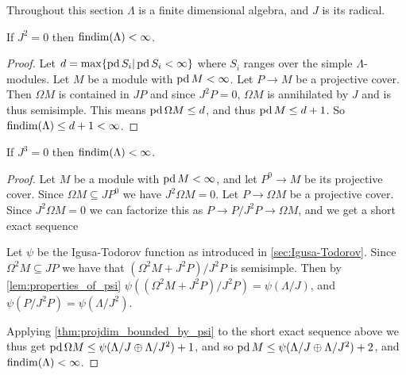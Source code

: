 Throughout this section $\Lambda$ is a finite dimensional algebra, and $J$ is its radical.

\begin{theorem}
	If $J^2=0$ then $\operatorname{findim}(\Lambda) < \infty$.
	\begin{proof}
		Let $d = \max\{\operatorname{pd} S_i | \operatorname{pd} S_i < \infty\}$ where $S_i$ ranges over the simple $\Lambda$-modules. Let $M$ be a module with $\operatorname{pd} M < \infty$. Let $P \to M$ be a projective cover. Then $\Omega M$ is contained in $JP$ and since $J^2P=0$, $\Omega M$ is annihilated by $J$ and is thus semisimple. This means $\operatorname{pd} \Omega M \leq d$, and thus $\operatorname{pd} M \leq d+1$. So $\operatorname{findim}(\Lambda) \leq d+1 < \infty$.
	\end{proof}
\end{theorem}

\begin{theorem}\cite[Corollary~6]{IgTo05}
	If $J^3=0$ then $\operatorname{findim}(\Lambda) < \infty$.
	\begin{proof}
		Let $M$ be a module with $\operatorname{pd} M < \infty$, and let $P^0 \to M$ be its projective cover. Since $\Omega M \subseteq JP^0$ we have $J^2\Omega M = 0$. Let $P \to \Omega M$ be a projective cover. Since $J^2\Omega M = 0$ we can factorize this as $P \to P/J^2P \to \Omega M$, and we get a short exact sequence
		\begin{center}
		\end{center}
		Let $\psi$ be the Igusa-Todorov function as introduced in \cref{sec:Igusa-Todorov}. Since $\Omega^2 M \subseteq JP$ we have that $(\Omega^2 M + J^2P) / J^2 P$ is semisimple. Then by \cref{lem:properties_of_psi} $\psi((\Omega^2 M + J^2P) / J^2 P) = \psi(\Lambda / J)$, and $\psi(P / J^2 P) = \psi(\Lambda / J^2)$.
		
		Applying \cref{thm:projdim_bounded_by_psi} to the short exact sequence above we thus get $\operatorname{pd} \Omega M \leq \psi(\Lambda / J \oplus \Lambda / J^2) + 1$, and so $\operatorname{pd} M \leq \psi(\Lambda / J \oplus \Lambda / J^2) + 2$, and $\operatorname{findim}(\Lambda) < \infty$.
	\end{proof}
\end{theorem}

